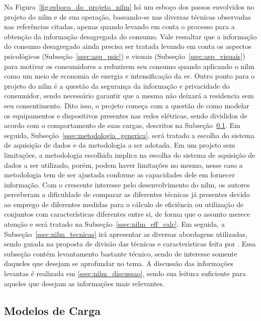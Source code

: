 Na Figura~\ref{fig:esboco_do_projeto_nilm} há um esboço dos passos
envolvidos no projeto do \acs{nilm} e de sua operação, baseando-se nas
diversas técnicas observadas nas referências citadas, apenas quando
levando em conta o processo para a obtenção da informação desagregada
do consumo. Vale ressaltar que a informação do consumo desagregado
ainda precisa ser tratada levando em conta os aspectos psicológicos
(Subseção~\ref{ssec:asp_psic}) e visuais
(Subseção~\ref{ssec:asp_visuais}) para motivar os consumidores a
reduzirem seu consumo quando aplicando o \acs{nilm} como um meio de
economia de energia e intensificação da \gls{ee}. Outro ponto para o 
projeto do \acs{nilm} é a questão da segurança da
informação e privacidade do consumidor, sendo necessário garantir que
a mesma não deixará a residencia sem seu consentimento. Dito isso, o
projeto começa com a questão de como modelar os equipamentos e
dispositivos presentes nas redes elétricas, sendo divididos de acordo
com o comportamento de suas cargas, descritos na
Subseção~\ref{ssec:modelos_carga}. Em seguida,
Subseção~\ref{ssec:metodologia_generica}, será tratado a escolha
do sistema de aquisição de dados e da metodologia a ser adotada. Em um
projeto sem limitações, a metodologia escolhida implica na escolha do
sistema de aquisição de dados a ser utilizado, porém, podem haver
limitações no mesmo, nesse caso a metodologia tem de ser ajustada
conforme as capacidades dele em fornecer informação. Com o crescente
interesse pelo desenvolvimento do \acs{nilm}, os autores perceberam a
dificuldade de comparar as diferentes técnicas já presentes devido ao
emprego de diferentes medidas para o cálculo de eficiência ou
utilização de conjuntos com características diferentes entre si, de
forma que o assunto merece atenção e será tratado na
Subseção~\ref{ssec:nilm_eff_calc}. Em seguida, a
Subseção~\ref{ssec:nilm_tecnicas} irá apresentar as diversas
abordagens utilizadas, sendo guiada na proposta de divisão das
técnicas e características feita por \cite{nilm_zeifman_review_2011}.
Essa subseção contém levantamento bastante técnico, sendo de
interesse somente daqueles que desejam se aprofundar no tema.  A
discussão das informações levantas é realizada em
\ref{ssec:nilm_discussao}, sendo sua leitura suficiente para
aqueles que desejam as informações mais relevantes.

\subsection{Modelos de Carga}
\label{ssec:modelos_carga}

